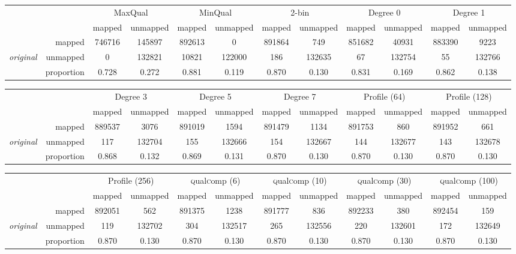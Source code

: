 \documentclass[12pt,\mydriver]{thesis}
\begin{document}
\begin{landscape}
\renewcommand{\baselinestretch}{1}
\small\normalsize

\begin{table}[!tbhp]
\centering
\begin{tabular}{lr|cc|cc|cc|cc|cc}
 & & \multicolumn{2}{c|}{MaxQual} & \multicolumn{2}{c|}{MinQual} & \multicolumn{2}{c|}{2-bin} & \multicolumn{2}{c|}{Degree 0} & \multicolumn{2}{c}{Degree 1} \\
& & mapped & unmapped & mapped & unmapped & mapped & unmapped & mapped & unmapped & mapped & unmapped \\
\cline{2-12}
& mapped & 746716 & 145897 & 892613 &   0 & 891864 & 749 & 851682 & 40931 & 883390 & 9223 \\
{\em original} & unmapped &   0 & 132821 & 10821 & 122000 & 186 & 132635 &  67 & 132754 &  55 & 132766 \\
\cline{2-12}
& proportion & 0.728 & 0.272 & 0.881 & 0.119 & 0.870 & 0.130 & 0.831 & 0.169 & 0.862 & 0.138 \\
\end{tabular}

\bigskip

\begin{tabular}{lr|cc|cc|cc|cc|cc}
 & & \multicolumn{2}{c|}{Degree 3} & \multicolumn{2}{c|}{Degree 5} & \multicolumn{2}{c|}{Degree 7} & \multicolumn{2}{c|}{Profile (64)} & \multicolumn{2}{c}{Profile (128)} \\
& & mapped & unmapped & mapped & unmapped & mapped & unmapped & mapped & unmapped & mapped & unmapped \\
\cline{2-12}
& mapped & 889537 & 3076 & 891019 & 1594 & 891479 & 1134 & 891753 & 860 & 891952 & 661 \\
{\em original} & unmapped & 117 & 132704 & 155 & 132666 & 154 & 132667 & 144 & 132677 & 143 & 132678 \\
\cline{2-12}
& proportion & 0.868 & 0.132 & 0.869 & 0.131 & 0.870 & 0.130 & 0.870 & 0.130 & 0.870 & 0.130 \\
\end{tabular}

\bigskip

\begin{tabular}{lr|cc|cc|cc|cc|cc}
&  & \multicolumn{2}{c|}{Profile (256)} & \multicolumn{2}{c|}{\textsc{q}ual\textsc{c}omp (6)} & \multicolumn{2}{c|}{\textsc{q}ual\textsc{c}omp (10)} & \multicolumn{2}{c|}{\textsc{q}ual\textsc{c}omp (30)} & \multicolumn{2}{c}{\textsc{q}ual\textsc{c}omp (100)} \\
& &  mapped & unmapped & mapped & unmapped & mapped & unmapped & mapped & unmapped & mapped & unmapped \\
\cline{2-12}
& mapped & 892051 & 562 & 891375 & 1238 & 891777 & 836 & 892233 & 380 & 892454 & 159 \\
{\em original}  & unmapped & 119 & 132702 & 304 & 132517 & 265 & 132556 & 220 & 132601 & 172 & 132649 \\
\cline{2-12}
& proportion & 0.870 & 0.130 & 0.870 & 0.130 & 0.870 & 0.130 & 0.870 & 0.130 & 0.870 & 0.130 \\


\end{tabular}
\end{table}
\end{landscape}
\end{document}
